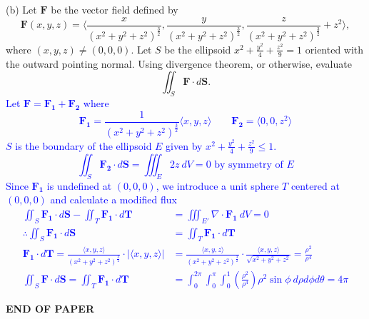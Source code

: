 \documentclass[12pt]{article}
\begin{document}
\newpage
(b) Let $\mathbf{F}$ be the vector field defined by
\[
\mathbf{F}(x,y,z)=\Bigg\langle\frac{x}{(x^2+y^2+z^2)^{\frac{3}{2}}},\frac{y}{(x^2+y^2+z^2)^{\frac{3}{2}}},\frac{z}{(x^2+y^2+z^2)^{\frac{3}{2}}}+z^2\Bigg\rangle,
\]
where $(x,y,z)\neq(0,0,0)$. Let $S$ be the ellipsoid $x^2+\frac{y^2}{4}+\frac{z^2}{9}=1$ oriented with the outward pointing normal. Using divergence theorem, or otherwise, evaluate
\[
\iint_S\mathbf{F}\cdot d\mathbf{S}.
\]
\textcolor{blue}{
Let $\mathbf{F}=\mathbf{F_1}+\mathbf{F_2}$ where
\[
\mathbf{F_1}=\frac{1}{(x^2+y^2+z^2)^\frac{3}{2}}\langle x,y,z\rangle\qquad\mathbf{F_2}=\langle0,0,z^2\rangle
\]
$S$ is the boundary of the ellipsoid $E$ given by $x^2+\frac{y^2}{4}+\frac{z^2}{9}\leq1$.
\[
	\iint_S\mathbf{F_2}\cdot d\mathbf{S}=\iiint_E2z\ dV=0\text{ by symmetry of }E
\]
Since $\mathbf{F_1}$ is undefined at $(0,0,0)$, we introduce a unit sphere $T$ centered at $(0,0,0)$ and calculate a modified flux
\begin{align*}
	\iint_S\mathbf{F_1}\cdot d\mathbf{S}-\iint_T\mathbf{F_1}\cdot d\mathbf{T}&=\iiint_{E'}\nabla\cdot\mathbf{F_1}\ dV=0\\
	\therefore\iint_S\mathbf{F_1}\cdot d\mathbf{S}&=\iint_T\mathbf{F_1}\cdot d\mathbf{T}\\
	\mathbf{F_1}\cdot d\mathbf{T}=\frac{\langle x,y,z\rangle}{(x^2+y^2+z^2)^\frac{3}{2}}\cdot|\langle x,y,z\rangle|&=\frac{\langle x,y,z\rangle}{(x^2+y^2+z^2)^\frac{3}{2}}\cdot\frac{\langle x,y,z\rangle}{\sqrt{x^2+y^2+z^2}}=\frac{\rho^2}{\rho^4}\\
	\iint_S\mathbf{F}\cdot d\mathbf{S}=\iint_T\mathbf{F_1}\cdot d\mathbf{T}&=\int_0^{2\pi}\int_0^{\pi}\int_0^1\left(\frac{\rho^2}{\rho^4}\right)\rho^2\sin\phi\ d\rho d\phi d\theta=4\pi
\end{align*}
}



\begin{center}
	\textbf{END OF PAPER}
\end{center}
\end{document}
